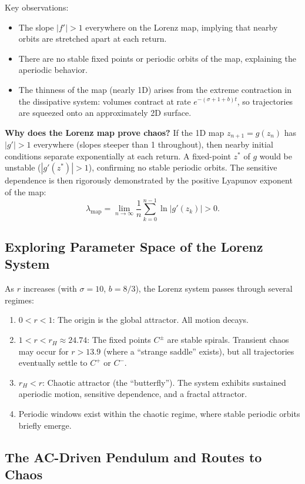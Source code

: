 \documentclass[11pt,letterpaper]{article}
\theoremstyle{definition}
\theoremstyle{plain}
\theoremstyle{remark}
\begin{document}
Key observations:
\begin{itemize}[leftmargin=2em]
\item The slope $|f'| > 1$ everywhere on the Lorenz map, implying that
      nearby orbits are stretched apart at each return.
\item There are no stable fixed points or periodic orbits of the map,
      explaining the aperiodic behavior.
\item The thinness of the map (nearly 1D) arises from the extreme
      contraction in the dissipative system: volumes contract at rate
      $e^{-(\sigma+1+b)t}$, so trajectories are squeezed onto an
      approximately 2D surface.
\end{itemize}

\textbf{Why does the Lorenz map prove chaos?}  If the 1D map $z_{n+1}=g(z_n)$
has $|g'|>1$ everywhere (slopes steeper than 1 throughout), then
nearby initial conditions separate exponentially at each return.
A fixed-point $z^*$ of $g$ would be unstable ($|g'(z^*)|>1$), confirming
no stable periodic orbits.  The sensitive dependence is then rigorously
demonstrated by the positive Lyapunov exponent of the map:
\[
  \lambda_{\mathrm{map}} = \lim_{n\to\infty}\frac{1}{n}
  \sum_{k=0}^{n-1}\ln|g'(z_k)| > 0.
\]

\subsection{Exploring Parameter Space of the Lorenz System}

As $r$ increases (with $\sigma=10$, $b=8/3$), the Lorenz system passes
through several regimes:
\begin{enumerate}[leftmargin=2em]
\item $0 < r < 1$: The origin is the global attractor.  All motion decays.
\item $1 < r < r_H \approx 24.74$: The fixed points $C^\pm$ are stable
      spirals.  Transient chaos may occur for $r > 13.9$ (where a
      ``strange saddle'' exists), but all trajectories eventually settle
      to $C^+$ or $C^-$.
\item $r_H < r$: Chaotic attractor (the ``butterfly'').  The system
      exhibits sustained aperiodic motion, sensitive dependence, and a
      fractal attractor.
\item Periodic windows exist within the chaotic regime, where stable
      periodic orbits briefly emerge.
\end{enumerate}

\subsection{The AC-Driven Pendulum and Routes to Chaos}\label{sec:ac-pendulum}
\end{document}
